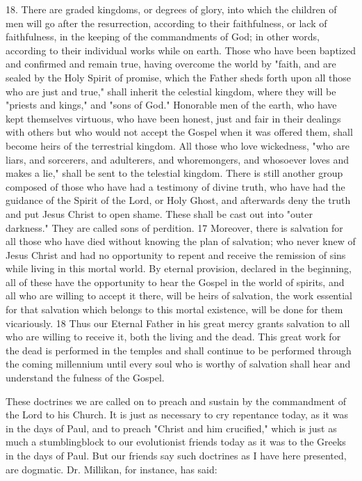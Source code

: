 18. There are graded kingdoms, or degrees of glory, into which the children of men will go
after the resurrection, according to their faithfulness, or lack of faithfulness, in the keeping of
the commandments of God; in other words, according to their individual works while on
earth. Those who have been baptized and confirmed and remain true, having overcome the
world by "faith, and are sealed by the Holy Spirit of promise, which the Father sheds forth
upon all those who are just and true," shall inherit the celestial kingdom, where they will be
"priests and kings," and "sons of God." Honorable men of the earth, who have kept
themselves virtuous, who have been honest, just and fair in their dealings with others but
who would not accept the Gospel when it was offered them, shall become heirs of the
terrestrial kingdom. All those who love wickedness, "who are liars, and sorcerers, and
adulterers, and whoremongers, and whosoever loves and makes a lie," shall be sent to the
telestial kingdom. There is still another group composed of those who have had a testimony
of divine truth, who have had the guidance of the Spirit of the Lord, or Holy Ghost, and
afterwards deny the truth and put Jesus Christ to open shame. These shall be cast out into
"outer darkness." They are called sons of perdition. 17 Moreover, there is salvation for all
those who have died without knowing the plan of salvation; who never knew of Jesus Christ
and had no opportunity to repent and receive the remission of sins while living in this mortal
world. By eternal provision, declared in the beginning, all of these have the opportunity to
hear the Gospel in the world of spirits, and all who are willing to accept it there, will be heirs
of salvation, the work essential for that salvation which belongs to this mortal existence, will
be done for them vicariously. 18 Thus our Eternal Father in his great mercy grants salvation
to all who are willing to receive it, both the living and the dead. This great work for the dead
is performed in the temples and shall continue to be performed through the coming
millennium until every soul who is worthy of salvation shall hear and understand the fulness
of the Gospel.

These doctrines we are called on to preach and sustain by the commandment of the Lord to
his Church. It is just as necessary to cry repentance today, as it was in the days of Paul, and
to preach "Christ and him crucified," which is just as much a stumblingblock to our
evolutionist friends today as it was to the Greeks in the days of Paul. But our friends say such
doctrines as I have here presented, are dogmatic. Dr. Millikan, for instance, has said:

